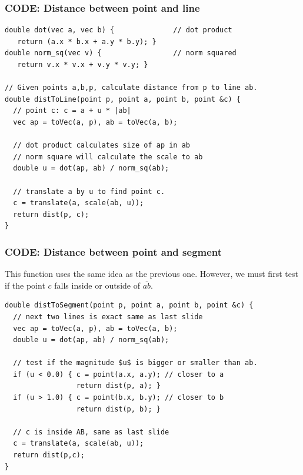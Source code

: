 \begin{frame}[fragile]
  \frametitle{CODE: Distance between point and line}

  {\smaller
  \begin{exampleblock}{}
\begin{verbatim}
double dot(vec a, vec b) {              // dot product
   return (a.x * b.x + a.y * b.y); }
double norm_sq(vec v) {                 // norm squared
   return v.x * v.x + v.y * v.y; }

// Given points a,b,p, calculate distance from p to line ab.
double distToLine(point p, point a, point b, point &c) {
  // point c: c = a + u * |ab|
  vec ap = toVec(a, p), ab = toVec(a, b);

  // dot product calculates size of ap in ab
  // norm square will calculate the scale to ab
  double u = dot(ap, ab) / norm_sq(ab);

  // translate a by u to find point c.
  c = translate(a, scale(ab, u));
  return dist(p, c);
}
\end{verbatim}
  \end{exampleblock}

}
\end{frame}

\begin{frame}[fragile]
  \frametitle{CODE: Distance between point and segment}

  This function uses the same idea as the previous one. However,
  we must first test if the point $c$ falls inside or outside of $\overline{ab}$.

  {\smaller
    \begin{exampleblock}{}
\begin{verbatim}
double distToSegment(point p, point a, point b, point &c) {
  // next two lines is exact same as last slide
  vec ap = toVec(a, p), ab = toVec(a, b);
  double u = dot(ap, ab) / norm_sq(ab);

  // test if the magnitude $u$ is bigger or smaller than ab.
  if (u < 0.0) { c = point(a.x, a.y); // closer to a
                 return dist(p, a); }
  if (u > 1.0) { c = point(b.x, b.y); // closer to b
                 return dist(p, b); }

  // c is inside AB, same as last slide
  c = translate(a, scale(ab, u));
  return dist(p,c);
}
\end{verbatim}
    \end{exampleblock}
  }
\end{frame}

